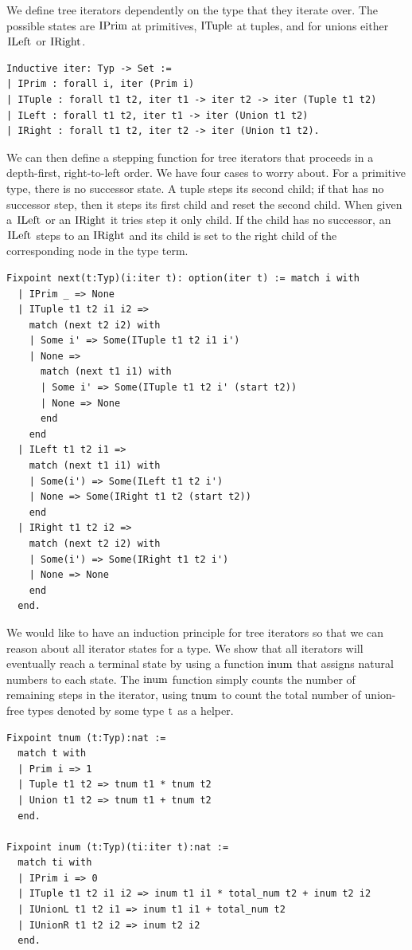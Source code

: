 \documentclass[a4paper,english]{lipics-v2019}
\renewcommand{\c}[1]{\ensuremath{\text{\lstinline{#1}}}\xspace}
\begin{document}
\noindent
We define tree iterators dependently on the type that they iterate over. The
possible states are \c{IPrim} at primitives, \c{ITuple} at tuples, and for
unions either \c{ILeft} or \c{IRight}.

\begin{lstlisting}
Inductive iter: Typ -> Set :=
| IPrim : forall i, iter (Prim i)
| ITuple : forall t1 t2, iter t1 -> iter t2 -> iter (Tuple t1 t2)
| ILeft : forall t1 t2, iter t1 -> iter (Union t1 t2)
| IRight : forall t1 t2, iter t2 -> iter (Union t1 t2).
\end{lstlisting}

We can then define a stepping function for tree iterators that proceeds in a
depth-first, right-to-left order.  We have four cases to worry about. For a
primitive type, there is no successor state. A tuple steps its second child;
if that has no successor step, then it steps its first child and reset the
second child. When given a \c{ILeft} or an \c{IRight} it tries step it only
child. If the child has no successor, an \c{ILeft} steps to an \c{IRight}
and its child is set to the right child of the corresponding node in the
type term.

\begin{lstlisting}
Fixpoint next(t:Typ)(i:iter t): option(iter t) := match i with
  | IPrim _ => None
  | ITuple t1 t2 i1 i2 =>
    match (next t2 i2) with
    | Some i' => Some(ITuple t1 t2 i1 i')
    | None =>
      match (next t1 i1) with
      | Some i' => Some(ITuple t1 t2 i' (start t2))
      | None => None
      end
    end
  | ILeft t1 t2 i1 =>
    match (next t1 i1) with
    | Some(i') => Some(ILeft t1 t2 i')
    | None => Some(IRight t1 t2 (start t2))
    end
  | IRight t1 t2 i2 => 
    match (next t2 i2) with
    | Some(i') => Some(IRight t1 t2 i')
    | None => None
    end
  end.
\end{lstlisting}

We would like to have an induction principle for tree iterators so that
we can reason about all iterator states for a type. We show that all iterators
will eventually reach a terminal state by using a function \c{inum} that assigns
natural numbers to each state. The \c{inum} function simply counts the number of
remaining steps in the iterator, using \c{tnum} to count the total number of union-free
types denoted by some type \c{t} as a helper.

\begin{lstlisting}
Fixpoint tnum (t:Typ):nat :=
  match t with
  | Prim i => 1
  | Tuple t1 t2 => tnum t1 * tnum t2
  | Union t1 t2 => tnum t1 + tnum t2
  end.

Fixpoint inum (t:Typ)(ti:iter t):nat :=
  match ti with
  | IPrim i => 0
  | ITuple t1 t2 i1 i2 => inum t1 i1 * total_num t2 + inum t2 i2
  | IUnionL t1 t2 i1 => inum t1 i1 + total_num t2
  | IUnionR t1 t2 i2 => inum t2 i2
  end.
\end{lstlisting}
\end{document}
